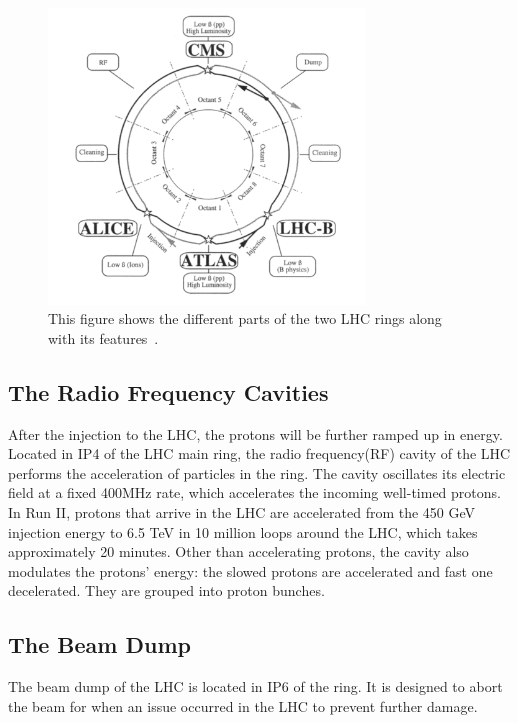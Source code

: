 \begin{figure}[!htb]
    \begin{center}
        \includegraphics[width=0.75\textwidth]{figures/chapter_ATLAS/LHCRing}
        \caption{
			This figure shows the different parts of the two LHC rings along with its features~\cite{Pettersson:291782}.
        }
        \label{fig:perterson}
    \end{center}
\end{figure}

\subsection{The Radio Frequency Cavities}
After the injection to the LHC, the protons will be further ramped up in energy. Located in IP4 of the LHC main ring, the radio frequency(RF) cavity of the LHC performs the acceleration of particles in the ring. The cavity oscillates its electric field at a fixed 400MHz rate, which accelerates the incoming well-timed protons. In Run II, protons that arrive in the LHC are accelerated from the 450 GeV injection energy to 6.5 TeV in 10 million loops around the LHC, which takes approximately 20 minutes. Other
than accelerating protons, the cavity also modulates the protons' energy: the slowed protons are accelerated and fast one decelerated. They are grouped into proton bunches.

\subsection{The Beam Dump}
The beam dump of the LHC is located in IP6 of the ring. It is designed to abort the beam for when an issue occurred in the LHC to prevent further damage. 

